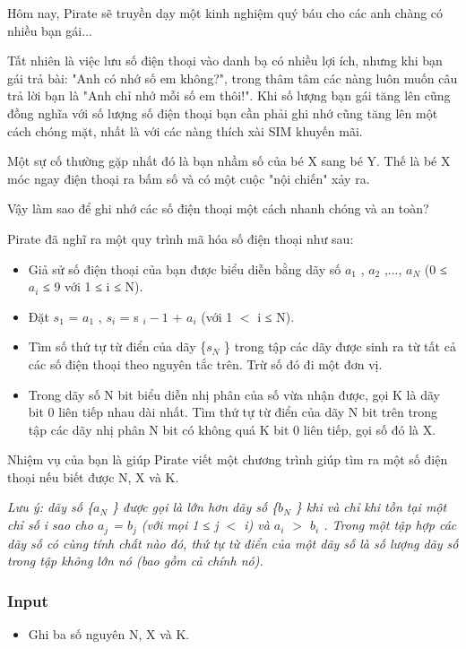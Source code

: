 



   Hôm nay, Pirate sẽ truyền dạy một kinh nghiệm quý báu cho các anh chàng có nhiều bạn gái...  

   Tất nhiên là việc lưu số điện thoại vào danh bạ có nhiều lợi ích, nhưng khi bạn gái trả bài: "Anh có nhớ số em không?", trong thâm tâm các nàng luôn muốn câu trả lời bạn là "Anh chỉ nhớ mỗi số em thôi!". Khi số lượng bạn gái tăng lên cũng đồng nghĩa với số lượng số điện thoại bạn cần phải ghi nhớ cũng tăng lên một cách chóng mặt, nhất là với các nàng thích xài SIM khuyến mãi.  

   Một sự cố thường gặp nhất đó là bạn nhầm số của bé X sang bé Y. Thế là bé X móc ngay điện thoại ra bấm số và có một cuộc "nội chiến" xảy ra.  

    Vậy làm sao để ghi nhớ các số điện thoại một cách nhanh chóng và an toàn?   

   Pirate đã nghĩ ra một quy trình mã hóa số điện thoại như sau:  
\begin{itemize}
	\item     Giả sử số điện thoại của bạn được biểu diễn bằng dãy số $a_{1}$    , $a_{2}$    ,..., $a_{N}$    (0 ≤ $a_{i}$    ≤ 9 với 1 ≤ i ≤ N).   
	\item     Đặt $s_{1}$    = $a_{1}$    , $s_{i}$    = s    $_     i - 1    $    + $a_{i}$    (với 1 $<$ i ≤ N).   
	\item     Tìm số thứ tự từ điển của dãy \{$s_{N}$    \} trong tập các dãy được sinh ra từ tất cả các số điện thoại theo nguyên tắc trên. Trừ số đó đi một đơn vị.   
	\item     Trong dãy số N bit biểu diễn nhị phân của số vừa nhận được, gọi K là dãy bit 0 liên tiếp nhau dài nhất. Tìm thứ tự từ điển của dãy N bit trên trong tập các dãy nhị phân N bit có không quá K bit 0 liên tiếp, gọi số đó là X.   
\end{itemize}

   Nhiệm vụ của bạn là giúp Pirate viết một chương trình giúp tìm ra một số điện thoại nếu biết được N, X và K.  

\emph{    Lưu ý: dãy số \{$a_{N}$    \} được gọi là lớn hơn dãy số \{$b_{N}$    \} khi và chỉ khi tồn tại một chỉ số i sao cho $a_{j}$    = $b_{j}$    (với mọi 1 ≤ j $<$ i) và $a_{i}$    $>$ $b_{i}$    . Trong một tập hợp các dãy số có cùng tính chất nào đó, thứ tự từ điển của một dãy số là số lượng dãy số trong tập không lớn nó (bao gồm cả chính nó).   }



\subsubsection{   Input  }
\begin{itemize}
	\item     Ghi ba số nguyên N, X và K.   
\end{itemize}

